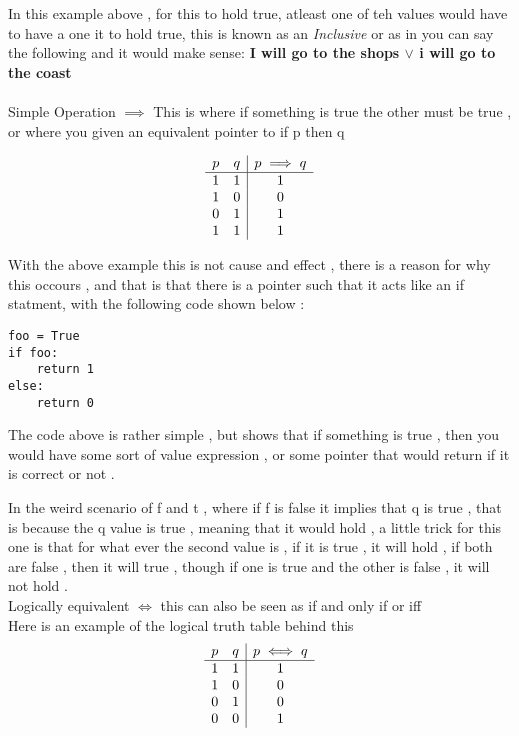 \documentclass{article}
\theoremstyle{mytheoremstyle}
\theoremstyle{mytheoremstyle}
\theoremstyle{myproblemstyle}
\begin{document}
In this example above , for this to hold true, atleast one of teh values would have to have a one it to hold true, this is known as an \textit{Inclusive} or as in you can say the following and it would make sense:
\textbf{I will go to the shops $\lor$ i will go to the coast}\\

\\

Simple Operation $\implies$
This is where if something is true the other must be true , or where you given an equivalent pointer to if p then q


\[\begin{array}{ c c | c }
    p & q & p \implies q \\
    \hline
    1 & 1 & 1 \\
    1 & 0 & 0 \\
    0 & 1 & 1 \\
    1 & 1 & 1 \\
\end{array}\]


With the above example this is not cause and effect , there is a reason for why this occours , and that is that there is a pointer such that it acts like an if statment, with the following code shown below :

\begin{lstlisting}
foo = True
if foo:
    return 1
else:
    return 0
\end{lstlisting}

The code above is rather simple , but shows that if something is true , then you would have some sort of value expression , or some pointer that would return if it is correct or not .

In the weird scenario of f and t , where if f is false it implies that q is true , that is because  the q value is true , meaning that it would hold , a little trick for this one is that for what ever the second value is , if it is true , it will hold , if both are false , then it will true , though if one is true and the other is false , it will not hold .\\

Logically equivalent $\iff$ this can also be seen as if and only if or iff \\
Here is an example of the logical truth table behind this
\[\begin{array}{c c | c }
    p & q & p \iff q \\
    \hline
    1 & 1 & 1 \\
    1 & 0 & 0 \\
    0 & 1 & 0 \\
    0 & 0 & 1 \\
\end{array}\]
\end{document}
